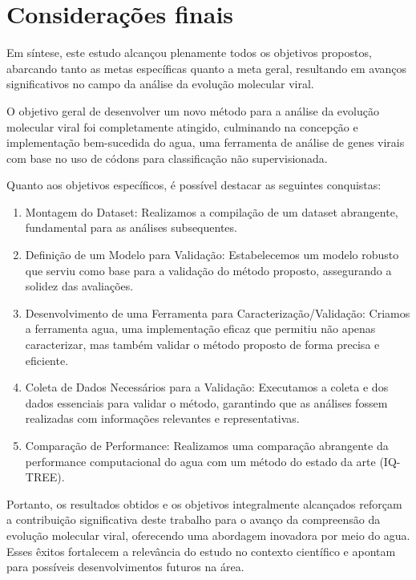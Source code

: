 \chapter{Considerações finais}

Em síntese, este estudo alcançou plenamente todos os objetivos propostos, abarcando tanto as metas específicas quanto a meta geral, resultando em avanços significativos no campo da análise da evolução molecular viral.

O objetivo geral de desenvolver um novo método para a análise da evolução molecular viral foi completamente atingido, culminando na concepção e implementação bem-sucedida do \gls{agua}, uma ferramenta de análise de genes virais com base no uso de códons para classificação não supervisionada.

Quanto aos objetivos específicos, é possível destacar as seguintes conquistas:

\begin{enumerate}[label=~(\roman*)]
  \item Montagem do Dataset: Realizamos a compilação de um dataset abrangente, fundamental para as análises subsequentes.
  \item Definição de um Modelo para Validação: Estabelecemos um modelo robusto que serviu como base para a validação do método proposto, assegurando a solidez das avaliações.
  \item Desenvolvimento de uma Ferramenta para Caracterização/Validação: Criamos a ferramenta \gls{agua}, uma implementação eficaz que permitiu não apenas caracterizar, mas também validar o método proposto de forma precisa e eficiente.
  \item Coleta de Dados Necessários para a Validação: Executamos a coleta e dos dados essenciais para validar o método, garantindo que as análises fossem realizadas com informações relevantes e representativas.
  \item Comparação de Performance: Realizamos uma comparação abrangente da performance computacional do \gls{agua} com um método do estado da arte (IQ-TREE).
\end{enumerate}

Portanto, os resultados obtidos e os objetivos integralmente alcançados reforçam a contribuição significativa deste trabalho para o avanço da compreensão da evolução molecular viral, oferecendo uma abordagem inovadora por meio do \gls{agua}. Esses êxitos fortalecem a relevância do estudo no contexto científico e apontam para possíveis desenvolvimentos futuros na área.

